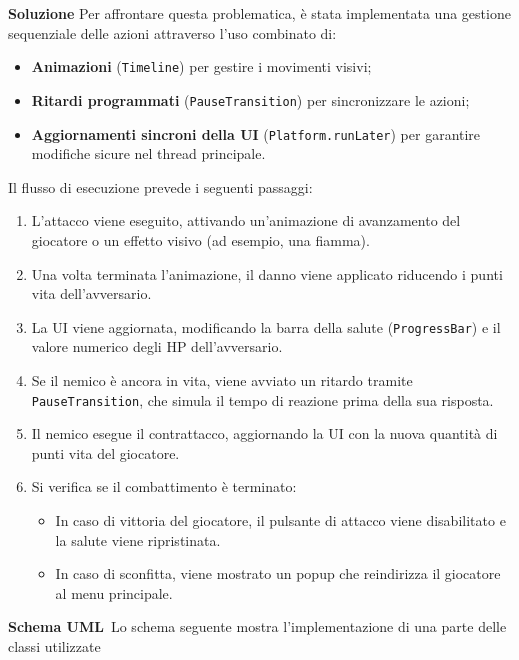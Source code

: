 \documentclass[a4paper,12pt]{report}
\begin{document}
\textbf{Soluzione}
Per affrontare questa problematica, è stata implementata una gestione sequenziale delle azioni attraverso l'uso combinato di:
\begin{itemize}
    \item \textbf{Animazioni} (\texttt{Timeline}) per gestire i movimenti visivi;
    \item \textbf{Ritardi programmati} (\texttt{PauseTransition}) per sincronizzare le azioni;
    \item \textbf{Aggiornamenti sincroni della UI} (\texttt{Platform.runLater}) per garantire modifiche sicure nel thread principale.
\end{itemize}

Il flusso di esecuzione prevede i seguenti passaggi:
\begin{enumerate}
    \item L’attacco viene eseguito, attivando un'animazione di avanzamento del giocatore o un effetto visivo (ad esempio, una fiamma).
    \item Una volta terminata l’animazione, il danno viene applicato riducendo i punti vita dell’avversario.
    \item La UI viene aggiornata, modificando la barra della salute (\texttt{ProgressBar}) e il valore numerico degli HP dell'avversario.
    \item Se il nemico è ancora in vita, viene avviato un ritardo tramite \texttt{PauseTransition}, che simula il tempo di reazione prima della sua risposta.
    \item Il nemico esegue il contrattacco, aggiornando la UI con la nuova quantità di punti vita del giocatore.
    \item Si verifica se il combattimento è terminato:
    \begin{itemize}
        \item In caso di vittoria del giocatore, il pulsante di attacco viene disabilitato e la salute viene ripristinata.
        \item In caso di sconfitta, viene mostrato un popup che reindirizza il giocatore al menu principale.
    \end{itemize}
\end{enumerate}

\textbf{Schema UML}\
Lo schema seguente mostra l'implementazione di una parte delle classi utilizzate
\end{document}
